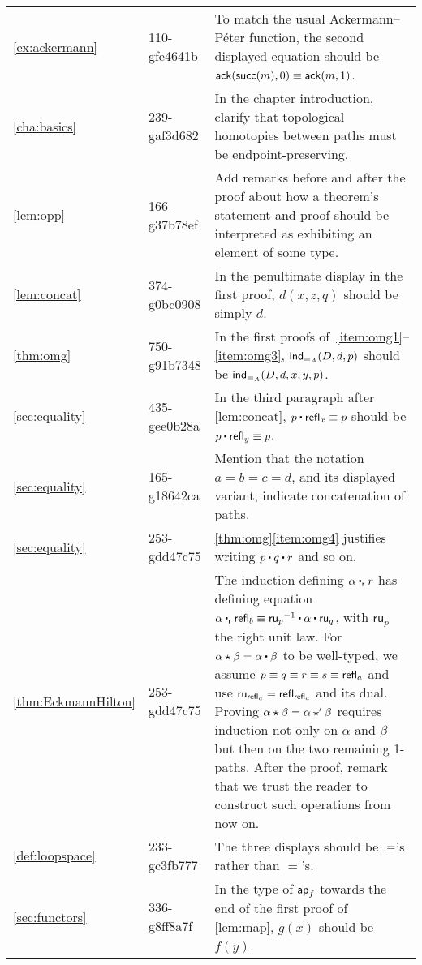 \documentclass[
%
%
11pt %
]{article}
\newcounter{chapter}            %
\begin{document}
\begin{longtable}{llp{10.5cm}}
  \cref{ex:ackermann}
  & 110-gfe4641b
  & To match the usual Ackermann--P\'eter function, the second displayed equation should be $\mathsf{ack}(\mathsf{succ}(m),0) \equiv \mathsf{ack}(m,1)$.\\
  \cref{cha:basics}
  & 239-gaf3d682
  & In the chapter introduction, clarify that topological homotopies between paths must be endpoint-preserving.\\
  \cref{lem:opp}
  & 166-g37b78ef
  & Add remarks before and after the proof about how a theorem's statement and proof should be interpreted as exhibiting an element of some type.\\
  \cref{lem:concat}
  & 374-g0bc0908
  & In the penultimate display in the first proof, $d(x,z,q)$ should be simply $d$.\\
  \cref{thm:omg}
  & 750-g91b7348
  & In the first proofs of~\ref{item:omg1}--\ref{item:omg3}, $\mathsf{ind}_{=_{A}}(D,d,p)$ should be $\mathsf{ind}_{=_{A}}(D,d,x,y,p)$.\\
  \cref{sec:equality}
  & 435-gee0b28a
  & In the third paragraph after \cref{lem:concat}, $p\ct\refl{x}\jdeq p$ should be $p\ct\refl{y}\jdeq p$.\\
  \cref{sec:equality}
  & 165-g18642ca
  & Mention that the notation $a=b=c=d$, and its displayed variant, indicate concatenation of paths.\\
  \cref{sec:equality}
  & 253-gdd47c75
  & \cref{thm:omg}\ref{item:omg4} justifies writing $p\ct q \ct r$ and so on.\\
  \cref{thm:EckmannHilton}
  & 253-gdd47c75
  & The induction defining $\alpha\rightwhisker r$ has defining equation $\alpha \rightwhisker \refl{b} \jdeq \opp{\mathsf{ru}_p} \ct \alpha \ct \mathsf{ru}_q$, with $\mathsf{ru}_p$ the right unit law.
  For $\alpha\hct\beta = \alpha\ct\beta$ to be well-typed, we assume $p\equiv q \equiv r \equiv s\equiv \mathsf{refl}_{a}$ and use $\mathsf{ru}_{\mathsf{refl}_{a}} = \mathsf{refl}_{\mathsf{refl}_{a}}$ and its dual.
  Proving $\alpha\star\beta = \alpha\star'\beta$ requires induction not only on $\alpha$ and $\beta$ but then on the two remaining 1-paths.
  After the proof, remark that we trust the reader to construct such operations from now on.\\
  \cref{def:loopspace}
  & 233-gc3fb777
  & The three displays should be $\vcentcolon\equiv$'s rather than $=$'s.\\
  \cref{sec:functors}
  & 336-g8ff8a7f
  & In the type of $\mathsf{ap}_{f}$ towards the end of the first proof of \cref{lem:map}, $g(x)$ should be $f(y)$.\\

\end{longtable}
\end{document}
